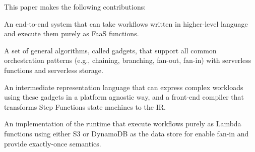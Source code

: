 This paper makes the following contributions:

\squishlist

  \item An end-to-end system that can take workflows written in higher-level
  language and execute them purely as FaaS functions.

  \item A set of general algorithms, called gadgets,  that support all common
  orchestration patterns (e.g., chaining, branching, fan-out, fan-in) with
  serverless functions and serverless storage.

  \item An intermediate representation language that can express complex
  workloads using these gadgets in a platform agnostic way, and a front-end
  compiler that transforms Step Functions state machines to the IR.

  \item An implementation of the \name{} runtime that execute workflows purely
  as Lambda functions using either S3 or DynamoDB as the data store for enable
  fan-in and provide exactly-once semantics.

\squishend

